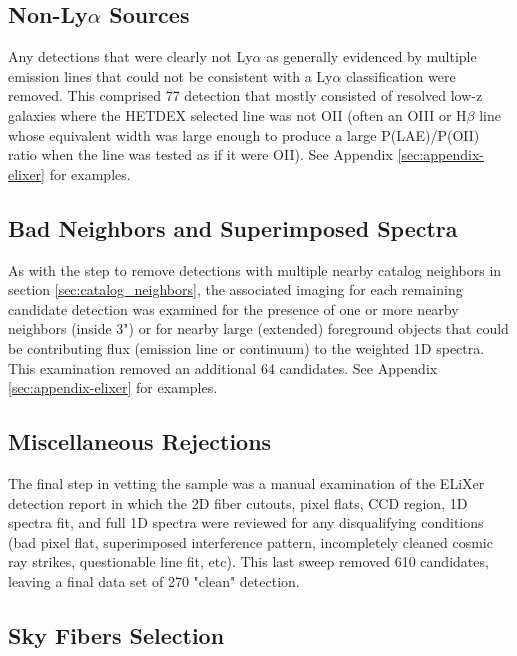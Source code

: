 \documentclass{aastex62}
\begin{document}
\subsection{Non-Ly$\alpha$ Sources}
Any detections that were clearly not Ly$\alpha$ as generally evidenced by multiple emission lines that could not be consistent with a Ly$\alpha$ classification were removed. This comprised 77 detection that mostly consisted of resolved low-z galaxies where the HETDEX selected line was not OII (often an OIII or H$\beta$ line whose equivalent width was large enough to produce a large P(LAE)/P(OII) ratio when the line was tested as if it were OII). See Appendix \ref{sec:appendix-elixer} for examples.\\
 


\subsection{Bad Neighbors and Superimposed Spectra}
As with the step to remove detections with multiple nearby catalog neighbors in section \ref{sec:catalog_neighbors}, the associated imaging for each remaining candidate detection was examined for the presence of one or more nearby neighbors (inside 3") or for nearby large (extended) foreground objects that could be contributing flux (emission line or continuum) to the weighted 1D spectra. This examination removed an additional 64 candidates. See Appendix \ref{sec:appendix-elixer} for examples.\\


\subsection{Miscellaneous Rejections}
The final step in vetting the sample was a manual examination of the ELiXer detection report in which the 2D fiber cutouts, pixel flats, CCD region, 1D spectra fit, and full 1D spectra were reviewed for any disqualifying conditions (bad pixel flat, superimposed interference pattern, incompletely cleaned cosmic ray strikes, questionable line fit, etc). This last sweep removed 610 candidates, leaving a final data set of 270 "clean" detection. \\


\subsection{Sky Fibers Selection}
\end{document}
